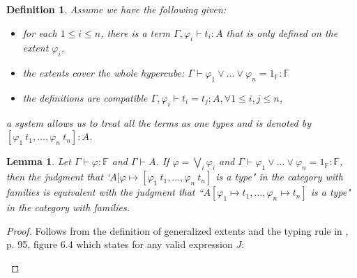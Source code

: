 \documentclass[11pt,a4paper,twoside,xetex,draft]{book}
\newcommand{\keyword}[1]{\emph{#1}\index{#1}}
\newtheorem{lemma}[theorem]{Lemma}
\newtheorem{definition}[theorem]{Definition}
\begin{document}
\begin{prooftree}
\end{prooftree}

\begin{definition}Assume we have the following given: 

\begin{itemize}
\item for each $1 \leq i \leq n$, there is a term  $\Gamma, \varphi_i \vdash t_i : A$ that is only defined on the extent $\varphi_i$, 
\item the extents cover the whole hypercube: $\Gamma \vdash \varphi_1 \vee ... \vee \varphi_n = 1_{\mathbb{F}} : \mathbb{F}$ 
\item the definitions are compatible $\Gamma, \varphi_i \vdash t_i = t_j : A, \forall 1\leq i,j\leq n$, 
\end{itemize}
a \keyword{system} allows us to treat all the terms as one types and is denoted by $[\varphi_1 \  t_1, ..., \varphi_n \ t_n]: A$.
\end{definition}

\begin{lemma}\label{extentrewrite}
Let $\Gamma \vdash \varphi : \mathbb{F}$ and $\Gamma \vdash A$. If $\varphi = \bigvee_i \varphi_i$ and $\Gamma \vdash \varphi_1 \vee ... \vee \varphi_n = 1_{\mathbb{F}} : \mathbb{F}$, then the judgment that `$A [\varphi \mapsto  [\varphi_1 \ t_1, ..., \varphi_n \ t_n]$ is a type" in the category with families is equivalent with the judgment that ``$A [\varphi_1 \mapsto t_1, ..., \varphi_n \mapsto t_n]$ is a type" in the category with families.

\end{lemma}

\begin{proof}
Follows from the definition of generalized extents and the typing rule in \cite{Huber2016}, p. 95, figure 6.4 which states for any valid expression $J$: 

\begin{prooftree}
\end{prooftree}

\end{proof}
\end{document}
